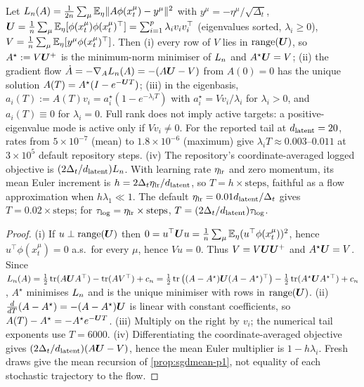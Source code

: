 \begin{lemma}\label{lem:gf-p1}
Let $L_{n}(A)=\tfrac1{2n}\sum_\mu\mathbb{E}_\eta\|A\phi(x^\mu_t)-y^\mu\|^2$ with $y^\mu=-\eta^\mu/\sqrt{\Delta_t}$, $\bm{U}=\tfrac1{n}\sum_\mu\mathbb{E}_\eta[\phi(x^\mu_t)\phi(x^\mu_t)^{\top}]=\sum_{i=1}^{p}\lambda_iv_iv_i^{\top}$ (eigenvalues sorted, $\lambda_i\ge0$), $V=\tfrac1{n}\sum_\mu\mathbb{E}_\eta[y^\mu\phi(x^\mu_t)^{\top}]$. Then (i) every row of $V$ lies in $\operatorname{range}(\bm{U})$, so $A^\star:=V\bm{U}^{+}$ is the minimum-norm minimiser of $L_{n}$ and $A^\star\bm{U}=V$; (ii) the gradient flow $\dot A=-\nabla_AL_{n}(A)=-(A\bm{U}-V)$ from $A(0)=0$ has the unique solution $A(T)=A^\star(I-e^{-\bm{U} T})$; (iii) in the eigenbasis, $a_i(T):=A(T)v_i=a_i^\star(1-e^{-\lambda_iT})$ with $a_i^\star=Vv_i/\lambda_i$ for $\lambda_i>0$, and $a_i(T)\equiv0$ for $\lambda_i=0$. Full rank does not imply active targets: a positive-eigenvalue mode is active only if $Vv_i\ne0$. For the reported tail at $d_{\mathrm{latent}}=20$, rates from $5\times10^{-7}$ (mean) to $1.8\times10^{-6}$ (maximum) give $\lambda_iT\approx0.003$--$0.011$ at $3\times10^5$ default repository steps. (iv) The repository's coordinate-averaged logged objective is $(2\Delta_t/d_{\mathrm{latent}})L_{n}$. With learning rate $\eta_{\rm lr}$ and zero momentum, its mean Euler increment is $h=2\Delta_t\eta_{\rm lr}/d_{\mathrm{latent}}$, so $T=h\times\text{steps}$, faithful as a flow approximation when $h\lambda_1\ll1$. The default $\eta_{\rm lr}=0.01d_{\mathrm{latent}}/\Delta_t$ gives $T=0.02\times\text{steps}$; for $\tau_{\rm log}=\eta_{\rm lr}\times\text{steps}$, $T=(2\Delta_t/d_{\mathrm{latent}})\tau_{\rm log}$.

\end{lemma}
\begin{proof}
(i) If $u\perp\operatorname{range}(\bm{U})$ then $0=u^{\top}\bm{U} u=\tfrac1{n}\sum_\mu\mathbb{E}_\eta(u^{\top}\phi(x^\mu_t))^2$, hence $u^{\top}\phi(x^\mu_t)=0$ a.s.\ for every $\mu$, hence $Vu=0$. Thus $V=V\bm{U}\bm{U}^{+}$ and $A^\star\bm{U}=V$. Since $L_{n}(A)=\tfrac12\operatorname{tr}(A\bm{U} A^{\top})-\operatorname{tr}(AV^{\top})+c_{n}=\tfrac12\operatorname{tr}\big((A-A^\star)\bm{U}(A-A^\star)^{\top}\big)-\tfrac12\operatorname{tr}(A^\star\bm{U} A^{\star\top})+c_{n}$, $A^\star$ minimises $L_{n}$ and is the unique minimiser with rows in $\operatorname{range}(\bm{U})$. (ii) $\tfrac{d}{dT}(A-A^\star)=-(A-A^\star)\bm{U}$ is linear with constant coefficients, so $A(T)-A^\star=-A^\star e^{-\bm{U} T}$. (iii) Multiply on the right by $v_i$; the numerical tail exponents use $T=6000$. (iv) Differentiating the coordinate-averaged objective gives $(2\Delta_t/d_{\mathrm{latent}})(A\bm{U}-V)$, hence the mean Euler multiplier is $1-h\lambda_i$. Fresh draws give the mean recursion of \cref{prop:sgdmean-p1}, not equality of each stochastic trajectory to the flow.

\end{proof}

